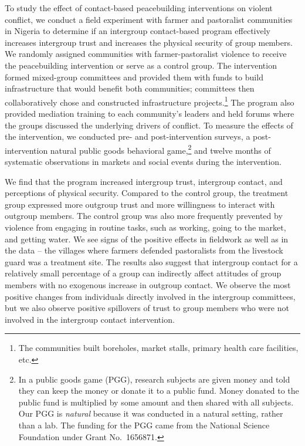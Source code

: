 \documentclass[11pt]{article}
\begin{document}
To study the effect of contact-based peacebuilding interventions on
violent conflict, we conduct a field experiment with farmer and
pastoralist communities in Nigeria to determine if an intergroup
contact-based program effectively increases intergroup trust and
increases the physical security of group members. We randomly assigned
communities with farmer-pastoralist violence to receive the
peacebuilding intervention or serve as a control group. The intervention
formed mixed-group committees and provided them with funds to build
infrastructure that would benefit both communities; committees then
collaboratively chose and constructed infrastructure projects.\footnote{The
  communities built boreholes, market stalls, primary health care
  facilities, etc.} The program also provided mediation training to each
community's leaders and held forums where the groups discussed the
underlying drivers of conflict. To measure the effects of the
intervention, we conducted pre- and post-intervention surveys, a
post-intervention natural public goods behavioral game,\footnote{In a
  public goods game (PGG), research subjects are given money and told
  they can keep the money or donate it to a public fund. Money donated
  to the public fund is multiplied by some amount and then shared with
  all subjects. Our PGG is \emph{natural} because it was conducted in a
  natural setting, rather than a lab. The funding for the PGG came from
  the National Science Foundation under Grant No.~1656871.} and twelve
months of systematic observations in markets and social events during
the intervention.

We find that the program increased intergroup trust, intergroup contact,
and perceptions of physical security. Compared to the control group, the
treatment group expressed more outgroup trust and more willingness to
interact with outgroup members. The control group was also more
frequently prevented by violence from engaging in routine tasks, such as
working, going to the market, and getting water. We see signs of the
positive effects in fieldwork as well as in the data -- the villages
where farmers defended pastoralists from the livestock guard was a
treatment site. The results also suggest that intergroup contact for a
relatively small percentage of a group can indirectly affect attitudes
of group members with no exogenous increase in outgroup contact. We
observe the most positive changes from individuals directly involved in
the intergroup committees, but we also observe positive spillovers of
trust to group members who were not involved in the intergroup contact
intervention.
\end{document}
